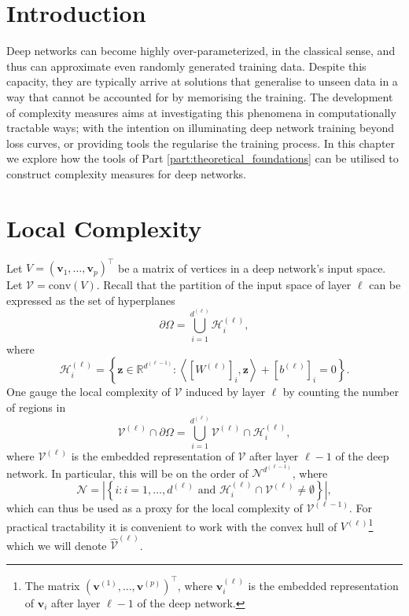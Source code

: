 \section{Introduction}

Deep networks can become highly over-parameterized, in the classical sense, and thus can approximate even randomly generated training data. Despite this capacity, they are typically arrive at solutions that generalise to unseen data in a way that cannot be accounted for by memorising the training. The development of complexity measures aims at investigating this phenomena in computationally tractable ways; with the intention on illuminating deep network training beyond loss curves, or providing tools the regularise the training process. In this chapter we explore how the tools of Part \ref{part:theoretical_foundations} can be utilised to construct complexity measures for deep networks.

\section{Local Complexity}\label{sec:local_complexity}

Let $V=\left(\mathbf{v}_1,\dots,\mathbf{v}_p\right)^\top$ be a matrix of vertices in a deep network's input space. Let $\mathcal{V}=\mathrm{conv}(V)$. Recall that the partition of the input space of layer $\ell$ can be expressed as the set of hyperplanes $$\partial\Omega=\bigcup_{i=1}^{d^{(\ell)}}\mathcal{H}^{(\ell)}_i,$$where $$\mathcal{H}^{(\ell)}_i=\left\{\mathbf{z}\in\mathbb{R}^{d^{(\ell-1)}}:\left\langle\left[W^{(\ell)}\right]_i,\mathbf{z}\right\rangle+\left[b^{(\ell)}\right]_i=0\right\}.$$One gauge the local complexity of $\mathcal{V}$ induced by layer $\ell$ by counting the number of regions in $$\mathcal{V}^{(\ell)}\cap\partial\Omega=\bigcup_{i=1}^{d^{(\ell)}}\mathcal{V}^{(\ell)}\cap\mathcal{H}^{(\ell)}_i,$$where $\mathcal{V}^{(\ell)}$ is the embedded representation of $\mathcal{V}$ after layer $\ell-1$ of the deep network. In particular, this will be on the order of $\mathcal{N}^{d^{(\ell-1)}}$, where $$\mathcal{N}=\left\vert\left\{i:i=1,\dots,d^{(\ell)}\text{ and }\mathcal{H}^{(\ell)}_i\cap\mathcal{V}^{(\ell)}\neq\emptyset\right\}\right\vert,$$which can thus be used as a proxy for the local complexity of $\mathcal{V}^{(\ell-1)}$. For practical tractability it is convenient to work with the convex hull of $V^{(\ell)}$\footnote{The matrix $\left(\mathbf{v}^{(1)},\dots,\mathbf{v}^{(p)}\right)^\top$, where $\mathbf{v}^{(\ell)}_i$ is the embedded representation of $\mathbf{v}_i$ after layer $\ell-1$ of the deep network.} which we will denote $\hat{\mathcal{V}}^{(\ell)}$.

